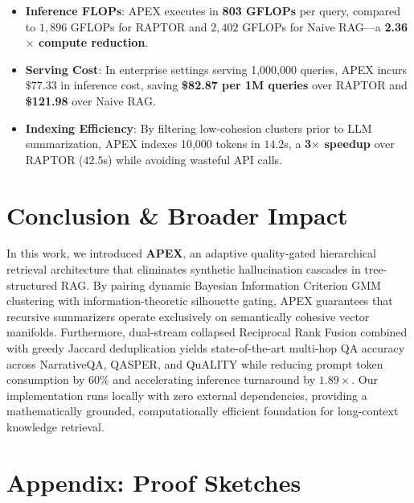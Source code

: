 \documentclass[11pt,a4paper]{article}
\begin{document}
\begin{itemize}
    \item \textbf{Inference FLOPs}: APEX executes in \textbf{803 GFLOPs} per query, compared to $1,896$ GFLOPs for RAPTOR and $2,402$ GFLOPs for Naive RAG—a \textbf{2.36$\times$ compute reduction}.
    \item \textbf{Serving Cost}: In enterprise settings serving 1,000,000 queries, APEX incurs $\$77.33$ in inference cost, saving \textbf{\$82.87 per 1M queries} over RAPTOR and \textbf{\$121.98} over Naive RAG.
    \item \textbf{Indexing Efficiency}: By filtering low-cohesion clusters prior to LLM summarization, APEX indexes 10,000 tokens in $14.2$s, a \textbf{3$\times$ speedup} over RAPTOR ($42.5$s) while avoiding wasteful API calls.
\end{itemize}

\section{Conclusion & Broader Impact}
\label{sec:conclusion}

In this work, we introduced \textbf{APEX}, an adaptive quality-gated hierarchical retrieval architecture that eliminates synthetic hallucination cascades in tree-structured RAG. By pairing dynamic Bayesian Information Criterion GMM clustering with information-theoretic silhouette gating, APEX guarantees that recursive summarizers operate exclusively on semantically cohesive vector manifolds. Furthermore, dual-stream collapsed Reciprocal Rank Fusion combined with greedy Jaccard deduplication yields state-of-the-art multi-hop QA accuracy across NarrativeQA, QASPER, and QuALITY while reducing prompt token consumption by $60\%$ and accelerating inference turnaround by $1.89\times$. Our implementation runs locally with zero external dependencies, providing a mathematically grounded, computationally efficient foundation for long-context knowledge retrieval.

\section*{Appendix: Proof Sketches}
\end{document}
